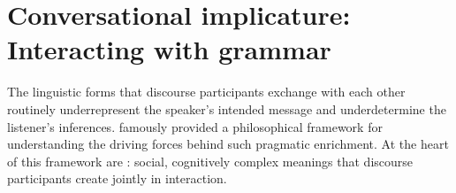 \documentclass[leqno,12pt]{article}
\begin{document}

\vspace{-16pt}


\section{Conversational implicature: Interacting with grammar}\label{sec:introduction}

The linguistic forms that discourse participants exchange with each
other routinely underrepresent the speaker's intended message and
underdetermine the listener's inferences. \citet{Grice75} famously
provided a philosophical framework for understanding the driving
forces behind such pragmatic enrichment. At the heart of this
framework are : social, cognitively
complex meanings that discourse participants create jointly in
interaction.
\end{document}
